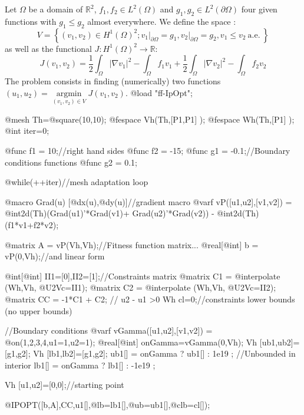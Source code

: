\documentclass[a4paper,twoside,12pt]{book}
\begin{document}
\begin{example}
Let $\Omega$ be a domain of $\mathbb{R}^{2}$, $f_{1}, f_{2}\in L^{2}(\Omega)$ and $g_{1}, g_{2} \in L^{2}(\partial\Omega)$ four given functions with $g_{1}\leq g_{2}$ almost everywhere.
We define the space : 
$$V = \left\lbrace (v_{1},v_{2})\in H^{1}(\Omega)^{2} ; v_{1}\vert_{\partial\Omega}=g_{1}, v_{2}\vert_{\partial\Omega}=g_{2}, v_{1}\leq v_{2}\ \mathrm{a.e.}\ \right\rbrace$$
as well as the functional $J:H^{1}(\Omega)^{2}\longrightarrow \mathbb{R}$:
$$J(v_{1},v_{2}) = \displaystyle{\frac{1}{2}\int_{\Omega}\vert\nabla v_{1}\vert^{2} - \int_{\Omega} f_{1}v_{1} +  \frac{1}{2}\int_{\Omega}\vert\nabla v_{2}\vert^{2} - \int_{\Omega} f_{2}v_{2}}$$
The problem consists in finding (numerically) two functions $(u_{1},u_{2}) = \underset{(v_{1},v_{2})\in V}{\operatorname{argmin}} J(v_{1},v_{2}) $. 
\bFF
@load "ff-IpOpt";

@mesh Th=@square(10,10);
@fespace Vh(Th,[P1,P1] );
@fespace Wh(Th,[P1] );
@int iter=0;

@func f1 =  10;//right hand sides
@func f2 = -15;
@func g1 = -0.1;//Boundary conditions functions
@func g2 =  0.1;

@while(++iter)//mesh adaptation loop
{
@macro Grad(u) [@dx(u),@dy(u)]//gradient macro
@varf vP([u1,u2],[v1,v2]) = @int2d(Th)(Grad(u1)'*Grad(v1)+ Grad(u2)'*Grad(v2)) 
- @int2d(Th)(f1*v1+f2*v2);

@matrix A = vP(Vh,Vh);//Fitness function matrix...
@real[@int] b = vP(0,Vh);//and linear form

@int[@int] II1=[0],II2=[1];//Constraints matrix
@matrix C1 =  @interpolate (Wh,Vh, @U2Vc=II1);
@matrix C2 =  @interpolate (Wh,Vh, @U2Vc=II2);
@matrix CC = -1*C1 + C2; // u2 - u1 >0
Wh cl=0;//constraints lower bounds (no upper bounds)

//Boundary conditions
@varf vGamma([u1,u2],[v1,v2]) = @on(1,2,3,4,u1=1,u2=1);
@real[@int] onGamma=vGamma(0,Vh);
Vh [ub1,ub2]=[g1,g2];
Vh [lb1,lb2]=[g1,g2];
ub1[] = onGamma ? ub1[] : 1e19  ; //Unbounded in interior
lb1[] = onGamma ? lb1[] : -1e19  ;

Vh [u1,u2]=[0,0];//starting point

@IPOPT([b,A],CC,u1[],@lb=lb1[],@ub=ub1[],@clb=cl[]);

}
\end{example}
\end{document}
